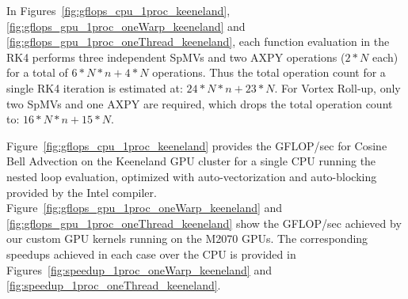 In Figures~\ref{fig:gflops_cpu_1proc_keeneland}, \ref{fig:gflops_gpu_1proc_oneWarp_keeneland} and \ref{fig:gflops_gpu_1proc_oneThread_keeneland}, each function evaluation in the RK4 performs three independent SpMVs and two AXPY operations ($2*N$ each) for a total of $6*N*n + 4*N$ operations. Thus the total operation count for a single RK4 iteration is estimated at: $24*N*n +23*N$. 
For Vortex Roll-up, only two SpMVs and one AXPY are required, which drops the total operation count to: $16*N*n + 15*N$. 

Figure~\ref{fig:gflops_cpu_1proc_keeneland} provides the GFLOP/sec for Cosine Bell Advection on the Keeneland GPU cluster for a single CPU running the nested loop evaluation, optimized with auto-vectorization and auto-blocking provided by the Intel compiler. Figure~\ref{fig:gflops_gpu_1proc_oneWarp_keeneland} and \ref{fig:gflops_gpu_1proc_oneThread_keeneland} show the GFLOP/sec achieved by our custom GPU kernels running on the M2070 GPUs. The corresponding speedups achieved in each case over the CPU is provided in Figures~\ref{fig:speedup_1proc_oneWarp_keeneland} and \ref{fig:speedup_1proc_oneThread_keeneland}. 

